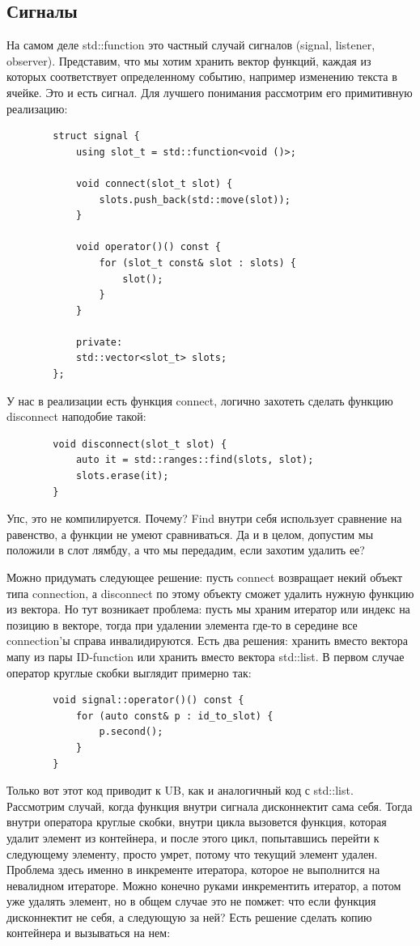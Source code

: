 \documentclass[12pt, a4paper]{article}
\begin{document}
	\subsection{Сигналы}
	На самом деле std::function это частный случай сигналов (signal, listener, observer). Представим, что мы хотим хранить вектор функций, каждая из которых соответствует определенному событию, например изменению текста в ячейке. Это и есть сигнал. Для лучшего понимания рассмотрим его примитивную реализацию:
	\begin{verbatim}
		struct signal {
			using slot_t = std::function<void ()>;
			
			void connect(slot_t slot) {
				slots.push_back(std::move(slot));
			}
			
			void operator()() const {
				for (slot_t const& slot : slots) {
					slot();
				}
			}
			
			private:
			std::vector<slot_t> slots;
		};
	\end{verbatim}
	У нас в реализации есть функция connect, логично захотеть сделать функцию disconnect наподобие такой:
	\begin{verbatim}
		void disconnect(slot_t slot) {
			auto it = std::ranges::find(slots, slot);
			slots.erase(it);
		}
	\end{verbatim}
	Упс, это не компилируется. Почему? Find внутри себя использует сравнение на равенство, а функции не умеют сравниваться. Да и в целом, допустим мы положили в слот лямбду, а что мы передадим, если захотим удалить ее?
	\par Можно придумать следующее решение: пусть connect возвращает некий объект типа connection, а disconnect по этому объекту сможет удалить нужную функцию из вектора. Но тут возникает проблема: пусть мы храним итератор или индекс на позицию в векторе, тогда при удалении элемента где-то в середине все connection'ы справа инвалидируются. Есть два решения: хранить вместо вектора мапу из пары ID-function или хранить вместо вектора std::list. В первом случае оператор круглые скобки выглядит примерно так:
	\begin{verbatim}
		void signal::operator()() const {
			for (auto const& p : id_to_slot) {
				p.second();
			}
		}
	\end{verbatim}
	Только вот этот код приводит к UB, как и аналогичный код с std::list. Рассмотрим случай, когда функция внутри сигнала дисконнектит сама себя. Тогда внутри оператора круглые скобки, внутри цикла вызовется функция, которая удалит элемент из контейнера, и после этого цикл, попытавшись перейти к следующему элементу, просто умрет, потому что текущий элемент удален. Проблема здесь именно в инкременте итератора, которое не выполнится на невалидном итераторе. Можно конечно руками инкрементить итератор, а потом уже удалять элемент, но в общем случае это не помжет: что если функция дисконнектит не себя, а следующую за ней? Есть решение сделать копию контейнера и вызываться на нем:
\end{document}
